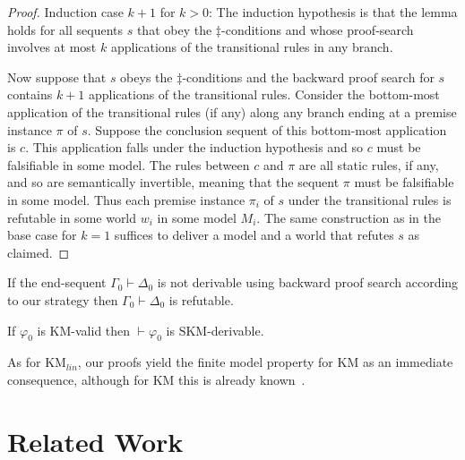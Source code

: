 \documentclass[envcountsect,envcountsame]{llncs}
\newcommand{\lcnxt}{\mathrm{KM}_{lin}}
\newcommand{\lgkm}{\mathrm{KM}}
\newcommand{\seq}{\vdash}
\newcommand{\seqkm}{\mathrm{SKM}}
\begin{document}
\begin{proof}
  Induction case $k+1$ for $k>0$: The induction hypothesis is that the
  lemma holds for all sequents
  $s$ that obey the $\ddagger$-conditions and whose proof-search
  involves at most $k$ applications of the transitional rules in
  any branch.

  Now suppose that $s$ obeys the $\ddagger$-conditions and the
  backward proof search for $s$ contains $k+1$ applications of the
  transitional rules. Consider the bottom-most application of the
  transitional rules (if any) along any branch ending at a premise instance
  $\pi$ of $s$. Suppose the conclusion sequent of this bottom-most
  application is $c$. This
  application falls under the induction hypothesis and so $c$ must be
  falsifiable in some model. The rules between $c$ and $\pi$ are all
  static rules, if any, and so are semantically invertible, meaning
  that the sequent $\pi$ must be falsifiable in some model. 
  Thus each
  premise instance $\pi_i$ of $s$ under the transitional rules is
  refutable in some world $w_i$ in some model $M_i$. The same
  construction as in the base case for $k=1$ suffices to deliver a
  model and a world that refutes $s$ as claimed.
\end{proof}





\begin{corollary}
 If the end-sequent $\Gamma_0\seq \Delta_0$ is not derivable using
 backward proof search according to our strategy then 
 $\Gamma_0\seq \Delta_0$ is refutable.
\end{corollary}


\begin{corollary}\label{km-completeness}
If $\varphi_0$ is $\lgkm$-valid then
$\vdash \varphi_0$ is $\seqkm$-derivable.
\end{corollary}

As for $\lcnxt$, our proofs yield the finite model property for $\lgkm$ as an immediate
consequence, although for $\lgkm$ this is already known~\cite{Muravitsky:Logic}.


\section{Related Work}
\end{document}
